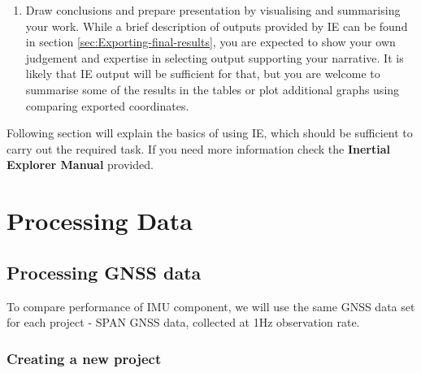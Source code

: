 \documentclass[11pt,fleqn]{book} %
\begin{document}
\begin{enumerate}
\begin{enumerate}
	\end{enumerate}
	\item Draw conclusions and prepare presentation by visualising and summarising your work. While a brief description of outputs provided by IE can be found in section \ref{sec:Exporting-final-results}, you are expected to show your own judgement and expertise in selecting output supporting your narrative. It is likely that IE output will be sufficient for that, but you are welcome to summarise some of the results in the tables or plot additional graphs using comparing exported coordinates.
\end{enumerate}


Following section will explain the basics of using IE, which should be sufficient to carry out the required task. If you need more information check the \textbf{Inertial Explorer Manual} provided.

\part{Processing Data}

\chapter{Processing GNSS data}\label{sec:Processing-GNSS-data}


To compare performance of IMU component, we will use the same GNSS data set for each project - SPAN GNSS data, collected at 1Hz observation rate.

\section{Creating a new project}\label{sec:Create-an-new}
\end{document}
